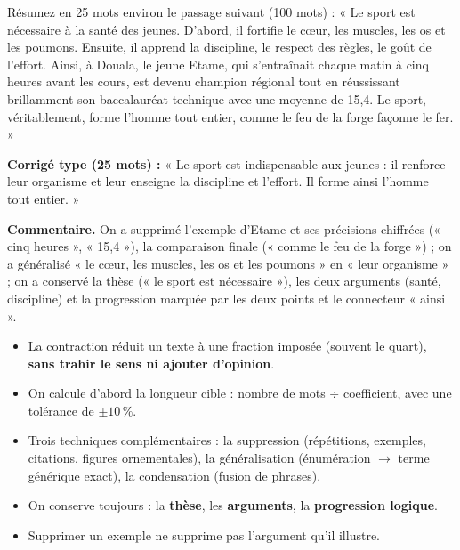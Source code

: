 \documentclass[11pt]{article}
\newcommand{\cle}[1]{{\popxbold\color{popdark}#1}}
\begin{document}
\begin{exercice}
Résumez en 25 mots environ le passage suivant (100 mots) : « Le sport est nécessaire à la santé des jeunes. D'abord, il fortifie le cœur, les muscles, les os et les poumons. Ensuite, il apprend la discipline, le respect des règles, le goût de l'effort. Ainsi, à Douala, le jeune Etame, qui s'entraînait chaque matin à cinq heures avant les cours, est devenu champion régional tout en réussissant brillamment son baccalauréat technique avec une moyenne de 15,4. Le sport, véritablement, forme l'homme tout entier, comme le feu de la forge façonne le fer. »
\end{exercice}

\begin{corrige}
\textbf{Corrigé type (25 mots) :} « Le sport est indispensable aux jeunes : il renforce leur organisme et leur enseigne la discipline et l'effort. Il forme ainsi l'homme tout entier. »

\textbf{Commentaire.} On a supprimé l'exemple d'Etame et ses précisions chiffrées (« cinq heures », « 15,4 »), la comparaison finale (« comme le feu de la forge ») ; on a généralisé « le cœur, les muscles, les os et les poumons » en « leur organisme » ; on a conservé la thèse (« le sport est nécessaire »), les deux arguments (santé, discipline) et la progression marquée par les deux points et le connecteur « ainsi ».
\end{corrige}

\begin{aretenir}
\begin{itemize}
\item La contraction réduit un texte à une fraction imposée (souvent le quart), \textbf{sans trahir le sens ni ajouter d'opinion}.
\item On calcule d'abord la longueur cible : nombre de mots $\div$ coefficient, avec une tolérance de $\pm 10\,\%$.
\item Trois techniques complémentaires : la \cle{suppression} (répétitions, exemples, citations, figures ornementales), la \cle{généralisation} (énumération $\to$ terme générique exact), la \cle{condensation} (fusion de phrases).
\item On conserve toujours : la \textbf{thèse}, les \textbf{arguments}, la \textbf{progression logique}.
\item Supprimer un exemple ne supprime pas l'argument qu'il illustre.
\end{itemize}
\end{aretenir}
\end{document}
